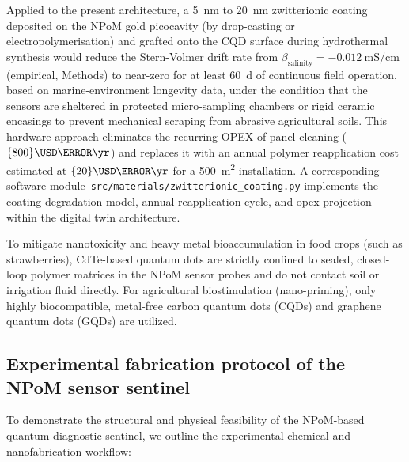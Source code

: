 \documentclass[11pt,a4paper]{article}
\begin{document}
Applied to the present architecture, a \qty{5}{\nm} to \qty{20}{\nm}
zwitterionic coating deposited on the NPoM gold picocavity (by drop-casting or
electropolymerisation) and grafted onto the CQD surface during hydrothermal
synthesis would reduce the Stern-Volmer drift rate from
$\beta_{\mathrm{salinity}} = \qty{-0.012}{\milli\siemens\per\cm}$ (empirical,
Methods) to near-zero for at least \qty{60}{\day} of continuous
field operation, based on marine-environment longevity data, under the condition that the sensors are sheltered in protected micro-sampling chambers or rigid ceramic encasings to prevent mechanical scraping from abrasive agricultural soils. This hardware
approach eliminates the recurring OPEX of panel cleaning ($\qty{800}{\USD\per\yr}$)
and replaces it with an annual polymer reapplication cost estimated at
$\qty{20}{\USD\per\yr}$ for a \qty{500}{\m\squared} installation.
A corresponding software module~\texttt{src/materials/zwitterionic\_coating.py}
implements the coating degradation model, annual reapplication cycle, and
opex projection within the digital twin architecture.

To mitigate nanotoxicity and heavy metal bioaccumulation in food crops (such as strawberries), CdTe-based quantum dots are strictly confined to sealed, closed-loop polymer matrices in the NPoM sensor probes and do not contact soil or irrigation fluid directly. For agricultural biostimulation (nano-priming), only highly biocompatible, metal-free carbon quantum dots (CQDs) and graphene quantum dots (GQDs) are utilized.

\subsection{Experimental fabrication protocol of the NPoM sensor sentinel}
\label{SI-sec:zwitterionic_fabrication}

To demonstrate the structural and physical feasibility of the NPoM-based quantum diagnostic sentinel, we outline the experimental chemical and nanofabrication workflow:
\end{document}
